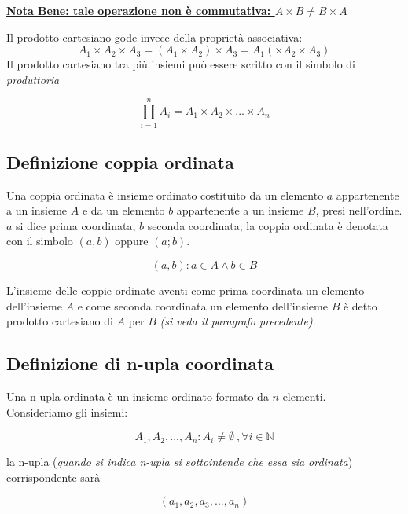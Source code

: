 \documentclass[a4paper]{article}
\newcommand{\Ne}{\mathbb{N}}
\newcommand{\n}{\par \noindent \newline}
\begin{document}
\underline{\textbf{Nota Bene: tale operazione non è commutativa: $A \times B \neq B \times A$}}
\n
Il prodotto cartesiano gode invece della proprietà associativa:
\begin{equation*}
	A_1 \times A_2 \times A_3 = (A_1 \times A_2) \times A_3 =A_1 (\times A_2 \times A_3) 
\end{equation*}
Il prodotto cartesiano tra più insiemi può essere scritto con il simbolo di \textit{produttoria}

\begin{equation*}
	\prod_{i=1}^{n} A_i = A_1 \times A_2 \times ... \times A_n
\end{equation*}


\subsection{Definizione coppia ordinata}
Una coppia ordinata è insieme ordinato costituito da un elemento $a$ appartenente a un insieme $A$ e da un elemento $b$ appartenente a un insieme $B$, presi nell’ordine. 
$a$ si dice prima coordinata, $b$ seconda coordinata; la coppia ordinata è denotata con il simbolo $ (a, b)$ oppure $(a; b). $ 

\begin{equation*}
			(a,b):a\in A \wedge b\in B
\end{equation*}

L’insieme delle coppie ordinate aventi come prima coordinata un elemento dell’insieme $A$ e come seconda coordinata un elemento dell’insieme $B$ è detto prodotto cartesiano di $A$ per $B$
\textit{(si veda il paragrafo precedente)}. 
\subsection[N-upla ordinata]{Definizione di n-upla coordinata}
Una n-upla ordinata è un insieme ordinato formato da $n$ elementi.\\
Consideriamo gli insiemi:

\begin{equation*}
			A_1,A_2,...,A_n : A_i \neq \emptyset \ , \forall i \in \Ne 
\end{equation*}

la n-upla (\textit{quando si indica n-upla si sottointende che essa sia ordinata}) corrispondente sarà

\begin{equation*}
			(a_1,a_2,a_3,...,a_n)
\end{equation*}
\end{document}
